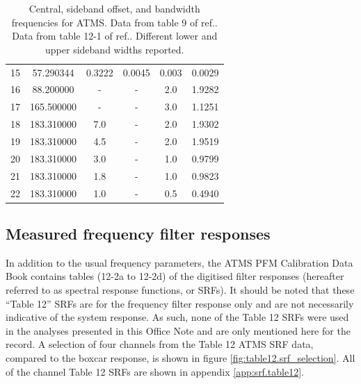 \begin{table}[htp]
\begin{tabular}{c c c c c c}
           15        &  57.290344  & 0.3222 & 0.0045 & 0.003  & 0.0029        \\
           16        &  88.200000  & -      & -      & 2.0    & 1.9282        \\
           17        & 165.500000  & -      & -      & 3.0    & 1.1251        \\
           18        & 183.310000  & 7.0    & -      & 2.0    & 1.9302        \\
           19        & 183.310000  & 4.5    & -      & 2.0    & 1.9519        \\
           20        & 183.310000  & 3.0    & -      & 1.0    & 0.9799        \\
           21        & 183.310000  & 1.8    & -      & 1.0    & 0.9823        \\
           22        & 183.310000  & 1.0    & -      & 0.5    & 0.4940        \\
    \hline
  \end{tabular}
  \caption{Central, sideband offset, and bandwidth frequencies for ATMS. Data from table 9 of ref.\cite{CrIS_EDR_ATBD}. Data from table 12-1 of ref.\cite{ATMS_PFM_CalLog}. Different lower and upper sideband widths reported. }
  \label{tab:atms_fo_sb_and_df}
\end{table}


\subsection{Measured frequency filter responses}
In addition to the usual frequency parameters, the ATMS PFM Calibration Data Book\cite{ATMS_PFM_CalLog} contains tables (12-2a to 12-2d) of the digitised filter responses (hereafter referred to as spectral response functions, or SRFs). It should be noted that these ``Table 12'' SRFs are for the frequency filter response only and are not necessarily indicative of the system response. As such, none of the Table 12 SRFs were used in the analyses presented in this Office Note and are only mentioned here for the record. A selection of four channels from the Table 12 ATMS SRF data, compared to the boxcar response, is shown in figure \ref{fig:table12.srf_selection}. All of the channel Table 12 SRFs are shown in appendix \ref{app:srf.table12}.

